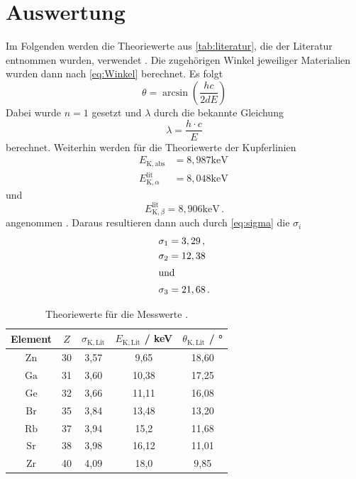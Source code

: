\section{Auswertung}
\label{sec:Auswertung}


Im Folgenden werden die Theoriewerte aus \autoref{tab:literatur}, die der Literatur entnommen wurden, verwendet \cite{x_ray_database}.
Die zugehörigen Winkel jeweiliger Materialien wurden dann nach \autoref{eq:Winkel} berechnet.
Es folgt 
\begin{equation*}
  \theta = \arcsin \left( \frac{h c}{2 d E} \right)
\end{equation*}
Dabei wurde $n = 1$ gesetzt und $\lambda$ durch die bekannte Gleichung 
\begin{equation*}
  \lambda = \frac{h \cdot c}{E}
\end{equation*}
berechnet.
Weiterhin werden für die Theoriewerte der Kupferlinien
\begin{align*}
  E_{\mathrm{K}, \mathrm{abs}} &=8,987 \mathrm{keV} \, \\
  E_{\mathrm{K}, \alpha}^{\mathrm{lit}} &=8,048 \mathrm{keV} 
\end{align*}
und
\begin{equation*}
  E_{\mathrm{K}, \beta}^{\mathrm{lit}} =8,906 \mathrm{keV} \, .
\end{equation*}
angenommen \cite{x_ray_database}.
Daraus resultieren dann auch durch \autoref{eq:sigma} die $\sigma_i$
\begin{align*}
  \sigma_{1} &=3,29 \, ,\\
  \sigma_{2} &=12,38 \\ 
  \intertext{und}
  \sigma_{3} &=21,68 \, .
\end{align*}
 
\begin{table}
  \centering
  \caption{Theoriewerte für die Messwerte \cite{x_ray_database}.}
  \label{tab:literatur}
  \begin{tabular}{ccccc} 
    \hline Element & $Z$ & $\sigma_{\mathrm{K, Lit}}$& $E_{\mathrm{K, Lit}}$ / keV & $\theta_{\mathrm{K, Lit}}$ / ° \\
    \hline 
    $\mathrm{Zn}$ & 30 & 3,57 & 9,65   & 18,60  \\
    $\mathrm{Ga}$ & 31 & 3,60 & 10,38  & 17,25  \\
    $\mathrm{Ge}$ & 32 & 3,66 & 11,11  & 16,08  \\
    $\mathrm{Br}$ & 35 & 3,84 & 13,48  & 13,20  \\
    $\mathrm{Rb}$ & 37 & 3,94 & 15,2   & 11,68   \\
    $\mathrm{Sr}$ & 38 & 3,98 & 16,12  & 11,01  \\
    $\mathrm{Zr}$ & 40 & 4,09 & 18,0   & 9,85    \\
    \hline
  \end{tabular}
\end{table}

